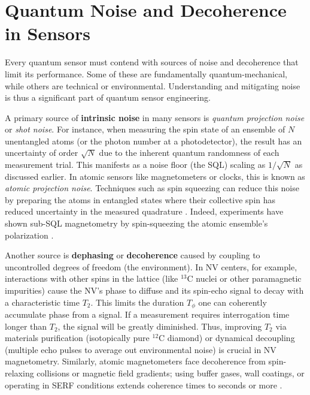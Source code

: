\section{Quantum Noise and Decoherence in Sensors}\label{sec:noise}

Every quantum sensor must contend with sources of noise and
decoherence that limit its performance. Some of these are
fundamentally quantum-mechanical, while others are technical or
environmental. Understanding and mitigating noise is thus a
significant part of quantum sensor engineering.



A primary source of \textbf{intrinsic noise} in many sensors is
\emph{quantum projection noise} or \emph{shot noise}. For instance,
when measuring the spin state of an ensemble of $N$ unentangled atoms
(or the photon number at a photodetector), the result has an
uncertainty of order $\sqrt{N}$ due to the inherent quantum randomness
of each measurement trial. This manifests as a noise floor (the SQL)
scaling as $1/\sqrt{N}$ as discussed earlier. In atomic sensors like
magnetometers or clocks, this is known as \emph{atomic projection
noise}. Techniques such as spin squeezing can reduce this noise by
preparing the atoms in entangled states where their collective spin
has reduced uncertainty in the measured quadrature . Indeed,
experiments have shown sub-SQL magnetometry by spin-squeezing the
atomic ensemble’s polarization .



Another source is \textbf{dephasing} or \textbf{decoherence} caused by
coupling to uncontrolled degrees of freedom (the environment). In NV
centers, for example, interactions with other spins in the lattice
(like $^{13}$C nuclei or other paramagnetic impurities) cause the NV’s
phase to diffuse and its spin-echo signal to decay with a
characteristic time $T_2$. This limits the duration $T_{\phi}$ one can
coherently accumulate phase from a signal. If a measurement requires
interrogation time longer than $T_2$, the signal will be greatly
diminished. Thus, improving $T_2$ via materials purification
(isotopically pure $^{12}$C diamond) or dynamical decoupling (multiple
echo pulses to average out environmental noise) is crucial in NV
magnetometry. Similarly, atomic magnetometers face decoherence from
spin-relaxing collisions or magnetic field gradients; using buffer
gases, wall coatings, or operating in SERF conditions extends
coherence times to seconds or more .



